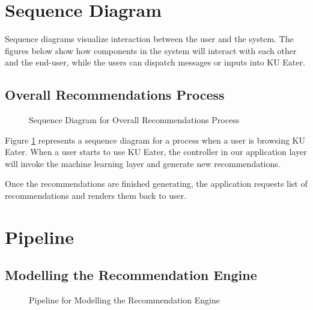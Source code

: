 \section{Sequence Diagram}
\label{section:sequence-diagram}

Sequence diagrams visualize interaction between the user and the system. The figures below show how components in the system will interact with
each other and the end-user, while the users can dispatch messages or inputs into KU Eater.

\subsection{Overall Recommendations Process}
\begin{figure}[h!]
    \centering
    
    \caption{Sequence Diagram for Overall Recommendations Process}
    \label{fig:seq-recommendation-process}
\end{figure}

Figure \ref{fig:seq-recommendation-process} represents a sequence diagram for a process when a user is browsing KU Eater. When a user
starts to use KU Eater, the controller in our application layer will invoke the machine learning layer and generate new recommendations.

Once the recommendations are finished generating, the application requests list of recommendations and renders them back to user.


\newpage

\section{Pipeline}
\label{section:pipeline}

\subsection{Modelling the Recommendation Engine}
\begin{figure}[h!]
    \centering
    
    \caption{Pipeline for Modelling the Recommendation Engine}
    \label{fig:pipeline-for-modelling}
\end{figure}

